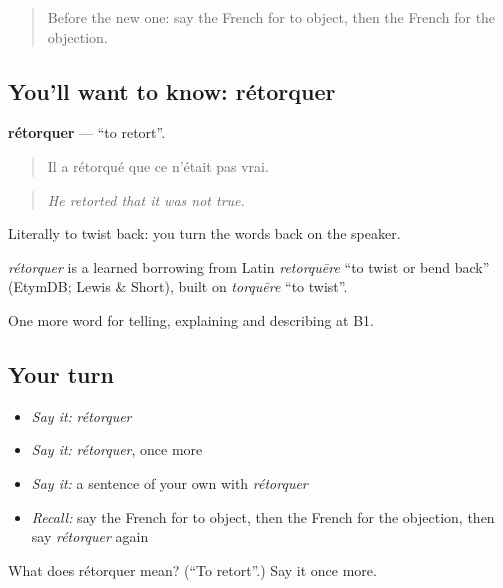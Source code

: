 \begin{quote}
Before the new one: say the French for to object, then the French for the objection.
\end{quote}

\subsection*{You'll want to know: rétorquer}
\textbf{rétorquer} — \textquotedblleft{}to retort\textquotedblright{}.

\begin{quote}
Il a rétorqué que ce n'était pas vrai.
\end{quote}

\begin{quote}
\emph{He retorted that it was not true.}
\end{quote}

Literally to twist back: you turn the words back on the speaker.

\begin{cousinweb}
\emph{rétorquer} is a learned borrowing from Latin \emph{retorquēre} \textquotedblleft{}to twist or bend back\textquotedblright{} (EtymDB; Lewis \& Short), built on \emph{torquēre} \textquotedblleft{}to twist\textquotedblright{}.
\end{cousinweb}

\begin{grammarlens}[title={What you've built}]
One more word for telling, explaining and describing at B1.
\end{grammarlens}

\subsection*{Your turn}
\begin{itemize}
\raggedright
  \item \emph{Say it:} \emph{rétorquer}
  \item \emph{Say it:} \emph{rétorquer}, once more
  \item \emph{Say it:} a sentence of your own with \emph{rétorquer}
  \item \emph{Recall:} say the French for to object, then the French for the objection, then say \emph{rétorquer} again
\end{itemize}

\begin{tcolorbox}[breakable,colback=teal!4,colframe=teal!35!black,title={Before you move on}]
What does rétorquer mean? (\textquotedblleft{}To retort\textquotedblright{}.) Say it once more.
\end{tcolorbox}
